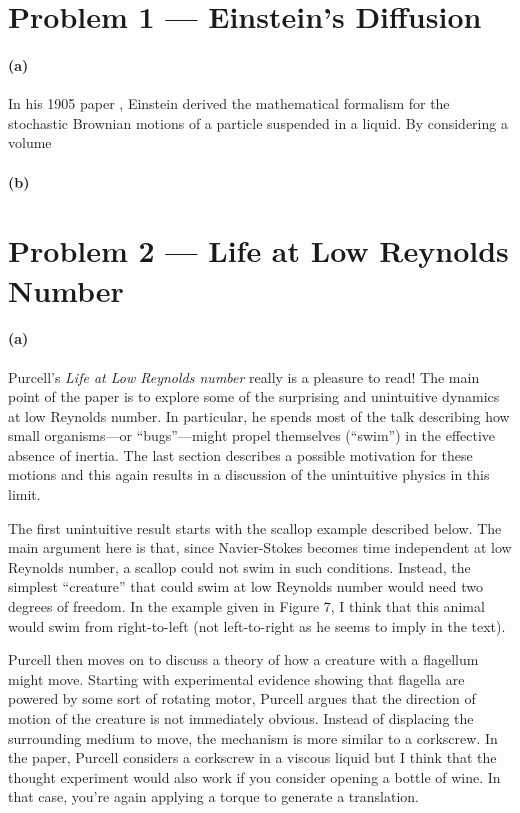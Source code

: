 \documentclass[12pt]{article}
\begin{document}
\section{Problem 1 --- Einstein's Diffusion}

\paragraph{(a)}

In his 1905 paper \cite{einstein}, Einstein derived the mathematical
formalism for the stochastic Brownian motions of a particle suspended in a
liquid.
By considering a volume


\paragraph{(b)}




\section{Problem 2 --- Life at Low Reynolds Number}

\paragraph{(a)}

Purcell's \emph{Life at Low Reynolds number} \cite{purcell} really is a
pleasure to read!
The main point of the paper is to explore some of the surprising and
unintuitive dynamics at low Reynolds number.
In particular, he spends most of the talk describing how small organisms---or
``bugs''---might propel themselves (``swim'') in the effective absence of
inertia.
The last section describes a possible motivation for these motions and this
again results in a discussion of the unintuitive physics in this limit.

The first unintuitive result starts with the scallop example described below.
The main argument here is that, since Navier-Stokes becomes time independent
at low Reynolds number, a scallop could not swim in such conditions.
Instead, the simplest ``creature'' that could swim at low Reynolds number
would need two degrees of freedom.
In the example given in Figure 7, I think that this animal would swim from
right-to-left (not left-to-right as he seems to imply in the text).

Purcell then moves on to discuss a theory of how a creature with a flagellum
might move.
Starting with experimental evidence showing that flagella are powered by some
sort of rotating motor, Purcell argues that the direction of motion of the
creature is not immediately obvious.
Instead of displacing the surrounding medium to move, the mechanism is more
similar to a corkscrew.
In the paper, Purcell considers a corkscrew in a viscous liquid but I think
that the thought experiment would also work if you consider opening a bottle
of wine.
In that case, you're again applying a torque to generate a translation.
\end{document}
